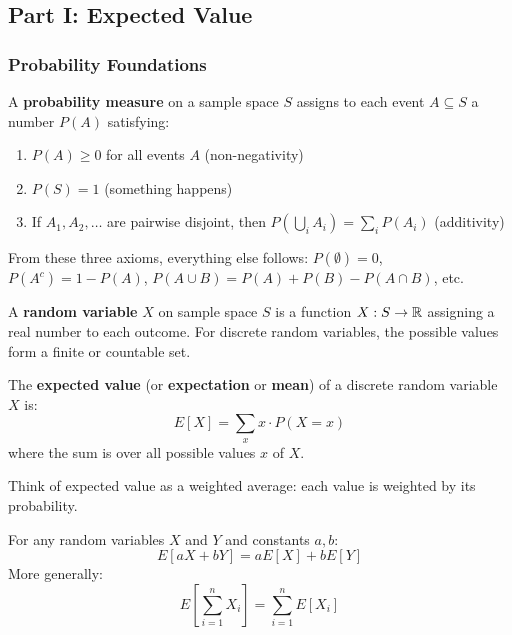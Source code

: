 \subsection*{Part I: Expected Value}

\subsubsection*{Probability Foundations}

\begin{definition}
A \textbf{probability measure} on a sample space $S$ assigns to each event $A \subseteq S$ a number $P(A)$ satisfying:
\begin{enumerate}
  \item $P(A) \geq 0$ for all events $A$ (non-negativity)
  \item $P(S) = 1$ (something happens)
  \item If $A_1, A_2, \ldots$ are pairwise disjoint, then $P(\bigcup_i A_i) = \sum_i P(A_i)$ (additivity)
\end{enumerate}
\end{definition}

From these three axioms, everything else follows: $P(\emptyset) = 0$, $P(A^c) = 1 - P(A)$, $P(A \cup B) = P(A) + P(B) - P(A \cap B)$, etc.

\begin{definition}
A \textbf{random variable} $X$ on sample space $S$ is a function $X: S \to \mathbb{R}$ assigning a real number to each outcome. For discrete random variables, the possible values form a finite or countable set.
\end{definition}

\begin{definition}
The \textbf{expected value} (or \textbf{expectation} or \textbf{mean}) of a discrete random variable $X$ is:
\[
E[X] = \sum_x x \cdot P(X = x)
\]
where the sum is over all possible values $x$ of $X$.
\end{definition}

Think of expected value as a weighted average: each value is weighted by its probability.

\begin{theorem}
For any random variables $X$ and $Y$ and constants $a, b$:
\[
E[aX + bY] = aE[X] + bE[Y]
\]
More generally:
\[
E\left[\sum_{i=1}^n X_i\right] = \sum_{i=1}^n E[X_i]
\]
\end{theorem}

